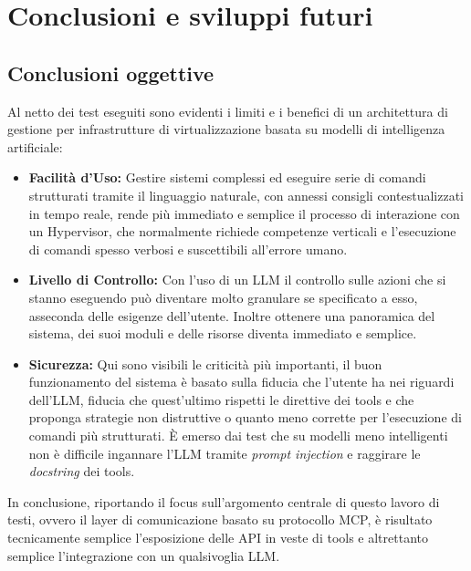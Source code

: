 \chapter{Conclusioni e sviluppi futuri}

\section{Conclusioni oggettive}
Al netto dei test eseguiti sono evidenti i limiti e i benefici di un architettura di gestione per infrastrutture di virtualizzazione basata su modelli di intelligenza artificiale:
\begin{itemize}
    \item \textbf{Facilità d'Uso:} Gestire sistemi complessi ed eseguire serie di comandi strutturati tramite il linguaggio naturale, con annessi consigli contestualizzati in tempo reale, rende più immediato e semplice il processo di interazione con un Hypervisor, che normalmente richiede competenze verticali e l'esecuzione di comandi spesso verbosi e suscettibili all'errore umano.
    \item \textbf{Livello di Controllo:} Con l'uso di un LLM il controllo sulle azioni che si stanno eseguendo può diventare molto granulare se specificato a esso, asseconda delle esigenze dell'utente. Inoltre ottenere una panoramica del sistema, dei suoi moduli e delle risorse diventa immediato e semplice.
    \item \textbf{Sicurezza:} Qui sono visibili le criticità più importanti, il buon funzionamento del sistema è basato sulla fiducia che l'utente ha nei riguardi dell'LLM, fiducia che quest'ultimo rispetti le direttive dei tools e che proponga strategie non distruttive o quanto meno corrette per l'esecuzione di comandi più strutturati. È emerso dai test che su modelli meno intelligenti non è difficile ingannare l'LLM tramite \textit{prompt injection} e raggirare le \textit{docstring} dei tools.
\end{itemize}

In conclusione, riportando il focus sull'argomento centrale di questo lavoro di testi, ovvero il layer di comunicazione basato su protocollo MCP, è risultato tecnicamente semplice l'esposizione delle API in veste di tools e altrettanto semplice l'integrazione con un qualsivoglia LLM.

